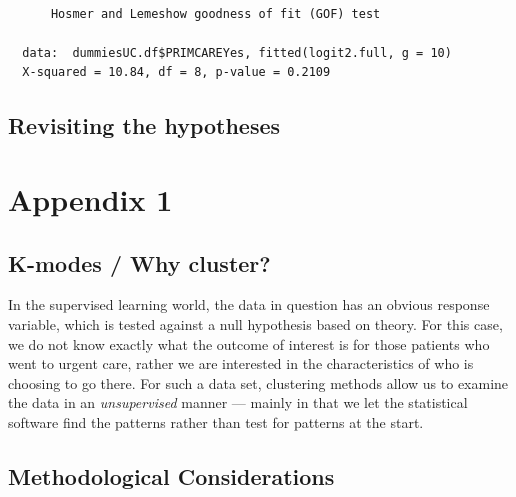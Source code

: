 \documentclass[12pt,twoside]{reedthesis}
\begin{document}
  \begin{Shaded}
  \begin{Highlighting}[]
  \StringTok{ }\NormalTok{))}
  \end{Highlighting}
  \end{Shaded}
  
  \begin{verbatim}
  
      Hosmer and Lemeshow goodness of fit (GOF) test
  
  data:  dummiesUC.df$PRIMCAREYes, fitted(logit2.full, g = 10)
  X-squared = 10.84, df = 8, p-value = 0.2109
  \end{verbatim}
  
  \section{Revisiting the hypotheses}\label{revisiting-the-hypotheses}
  
  \chapter*{Appendix 1}\label{appendix-1}
  
  \section*{K-modes / Why cluster?}\label{k-modes-why-cluster}
  
  In the supervised learning world, the data in question has an obvious
  response variable, which is tested against a null hypothesis based on
  theory. For this case, we do not know exactly what the outcome of
  interest is for those patients who went to urgent care, rather we are
  interested in the characteristics of who is choosing to go there. For
  such a data set, clustering methods allow us to examine the data in an
  \emph{unsupervised} manner --- mainly in that we let the statistical
  software find the patterns rather than test for patterns at the start.
  
  \section*{Methodological
  Considerations}\label{methodological-considerations}
  
\end{document}
